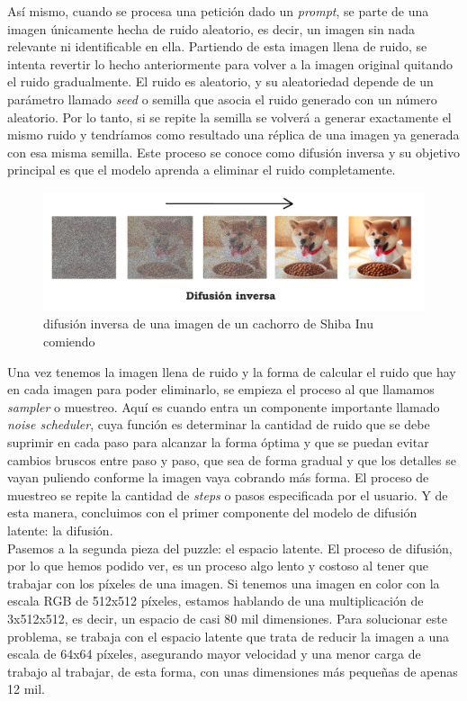 Así mismo, cuando se procesa una petición dado un \textit{prompt}, se parte de una imagen únicamente hecha de ruido aleatorio, es decir, un imagen sin nada relevante ni identificable en ella. Partiendo de esta imagen llena de ruido, se intenta revertir lo hecho anteriormente para volver a la imagen original quitando el ruido gradualmente. El ruido es aleatorio, y su aleatoriedad depende de un parámetro llamado \textit{seed} o semilla que asocia el ruido generado con un número aleatorio. Por lo tanto, si se repite la semilla se volverá a generar exactamente el mismo ruido y tendríamos como resultado una réplica de una imagen ya generada con esa misma semilla. Este proceso se conoce como difusión inversa y su objetivo principal es que el modelo aprenda a eliminar el ruido completamente. \\

\begin{figure}[h]
	\centering
	\includegraphics[width = 1 \textwidth]{Imagenes/Vectorial/difusioninversa.png}
	\caption{difusión inversa de una imagen de un cachorro de Shiba Inu comiendo}
	\label{fig:difusioninversa}
\end{figure}

Una vez tenemos la imagen llena de ruido y la forma de calcular el ruido que hay en cada imagen para poder eliminarlo, se empieza el proceso al que llamamos \textit{sampler} o muestreo. Aquí es cuando entra un componente importante llamado \textit{noise scheduler}, cuya función es determinar la cantidad de ruido que se debe suprimir en cada paso para alcanzar la forma óptima y que se puedan evitar cambios bruscos entre paso y paso, que sea de forma gradual y que los detalles se vayan puliendo conforme la imagen vaya cobrando más forma. El proceso de muestreo se repite la cantidad de \textit{steps} o pasos especificada por el usuario. Y de esta manera, concluimos con el primer componente del modelo de difusión latente: la difusión.\\ 

Pasemos a la segunda pieza del puzzle: el espacio latente. El proceso de difusión, por lo que hemos podido ver, es un proceso algo lento y costoso al tener que trabajar con los píxeles de una imagen. Si tenemos una imagen en color con la escala RGB de 512x512 píxeles, estamos hablando de una multiplicación de 3x512x512, es decir, un espacio de casi 80 mil dimensiones. Para solucionar este problema, se trabaja con el espacio latente que trata de reducir la imagen a una escala de 64x64 píxeles, asegurando mayor velocidad y una menor carga de trabajo al trabajar, de esta forma, con unas dimensiones más pequeñas de apenas 12 mil. 

